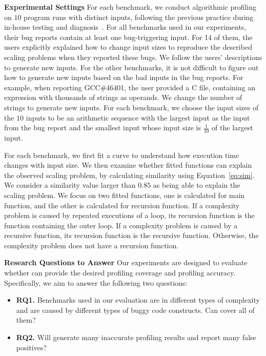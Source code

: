 

\textbf{Experimental Settings}
For each benchmark, 
we conduct algorithmic profiling on $10$ program runs with distinct inputs, 
following the previous practice during in-house 
testing and diagnosis~\cite{SongOOPSLA2014,joy.asplos13}.
For all benchmarks used in our experiments,
their bug reports contain at least one bug-triggering input. 
For 14 of them, 
the users explicitly explained how to change input sizes to 
reproduce the described scaling problems when they reported these bugs. 
We follow the users' 
descriptions to generate new inputs.
For the other benchmarks, 
it is not difficult to figure out how to generate new inputs based 
on the bad inputs in the bug reports. 
For example, when reporting GCC\#46401, 
the user provided a C file, 
containing an expression with thousands of strings as operands. 
We change the number of strings to generate new inputs.
For each benchmark, we choose the input sizes of the $10$ inputs to be 
an arithmetic sequence with the largest input as the input from the bug report 
and the smallest input whose input size is 
$\frac{1}{10}$ of the largest input.

For each benchmark, we first fit a curve to understand how execution 
time changes with input size. 
We then examine whether fitted functions can explain the observed scaling problem, 
by calculating similarity using Equation~\ref{eq:sim}. 
We consider a similarity value larger than $0.85$ as being able to explain the scaling problem. 
We focus on two fitted functions, one is calculated for main function, 
and the other is calculated for recursion function. 
If a complexity problem is caused by repeated executions of a loop,
its recursion function is the function containing the outer loop.
If a complexity problem is caused by a recursive function, 
its recursion function is the recursive function. 
Otherwise, the complexity problem does not have a recursion function. 


\textbf{Research Questions to Answer}
Our experiments are designed to evaluate whether \Tool can provide the desired profiling coverage 
and profiling accuracy. 
Specifically, we aim to answer the following two questions:

\begin{itemize}

\item {\bf RQ1.} 
Benchmarks used in our evaluation are in different types of complexity and 
are caused by different types of buggy code constructs. 
Can \Tool cover all of them? 
 
\item {\bf RQ2.}
Will \Tool generate many inaccurate profiling results and report many false positives? 

\end{itemize}

